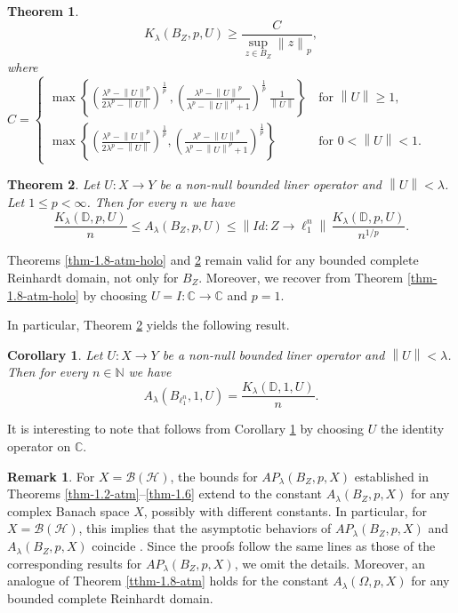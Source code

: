 \documentclass[a4paper,11pt, reqno]{amsart}
\newtheorem{thm}{Theorem}[section]
\newtheorem{cor}{Corollary}[section]
\theoremstyle{definition}
\newtheorem{rem}{Remark}[section]
\newcommand{\real}{{\operatorname{Re}\,}}
\newcommand{\norm}[1]{\left\lVert#1\right\rVert}
\begin{document}
{\begin{thm}
		$$K_{\lambda}(B_{Z}, p,U) \geq  \frac{C}{\sup_{z \in B_{Z}}\norm{z}_{p}},$$
		where 
		$	C=\begin{cases}
			\max \left\{\left(\frac{\lambda^p - \norm{U}^p}{2\lambda^p - \norm{U}}\right)^{\frac{1}{p}}\, , \left(\frac{\lambda^p - \norm{U}^p}{\lambda^p - \norm{U}^p +1}\right)^{\frac{1}{p}}\, \frac{1}{\norm{U}}\right\}\,  & \text{for $\norm{U}\geq 1$},\\[3mm]
			\max \left\{\left(\frac{\lambda^p - \norm{U}^p}{2\lambda^p - \norm{U}}\right)^{\frac{1}{p}}, \left(\frac{\lambda^p - \norm{U}^p}{\lambda^p - \norm{U}^p +1}\right)^{\frac{1}{p}}\right\} & \text{for $0<\norm{U}< 1$}.
		\end{cases}
		$
\end{thm}}
\begin{thm}\label{tthm-1.10-atm-holo}
	Let $U:X\rightarrow Y$ be a non-null bounded liner operator and $\norm{U} < \lambda$.	Let $1\leq p<\infty$. Then for every $n$ we have 
	\begin{equation*}
		\frac{K_\lambda(\mathbb{D},p,U)}{n}\leq A_\lambda(B_{Z},p, U)\leq \norm{Id: Z \rightarrow \ell^n_{1}}\, \frac{K_\lambda(\mathbb{D},p,U)}{n^{1/p}}.
	\end{equation*}
\end{thm}
Theorems \ref{thm-1.8-atm-holo} and \ref{tthm-1.10-atm-holo} remain valid for any bounded complete Reinhardt domain, not only for $B_Z$. Moreover, we recover \cite[Lemma 4.3]{defant-2008} from Theorem \ref{thm-1.8-atm-holo} by choosing $U=I:\mathbb{C} \rightarrow \mathbb{C}$ and $p=1$.
\par In particular, Theorem \ref{tthm-1.10-atm-holo} yields the following result.
\begin{cor} \label{cor-1.8-a}
	Let $U:X\rightarrow Y$ be a non-null bounded liner operator and $\norm{U} < \lambda$.	Then for every $n \in \mathbb{N}$ we have 
	\begin{equation*}
		A_\lambda(B_{\ell^n_1},1, U)=\frac{K_\lambda(\mathbb{D},1,U)}{n}.
	\end{equation*}
\end{cor}
It is interesting to note that \cite[Theorem 3.1]{defant-2008} follows from Corollary \ref{cor-1.8-a} by choosing $U$ the identity operator on $\mathbb{C}$.
\begin{rem}
	For $X=\mathcal{B}(\mathcal{H})$, the bounds for $AP_{\lambda}(B_{Z}, p,X)$ established in Theorems \ref{thm-1.2-atm}–\ref{thm-1.6} extend to the constant $A_{\lambda}(B_{Z}, p,X)$ for any complex Banach space $X$, possibly with different constants. In particular, for $X=\mathcal{B}(\mathcal{H})$, this implies that the asymptotic behaviors of $AP_{\lambda}(B_{Z}, p,X)$ and $A_{\lambda}(B_{Z}, p,X)$ coincide . Since the proofs follow the same lines as those of the corresponding results for $AP_{\lambda}(B_{Z}, p,X)$, we omit the details. Moreover, an analogue of Theorem \ref{tthm-1.8-atm} holds for the constant $A_{\lambda}(\Omega, p,X)$ for any bounded complete Reinhardt domain.
\end{rem}
\end{document}
